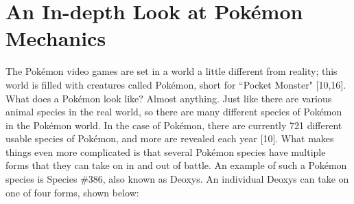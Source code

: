 \documentclass{article}
\begin{document}
\section{An In-depth Look at Pok\'emon Mechanics}
The Pok\'emon video games are set in a world a little different from reality; this world is filled with creatures called Pok\'emon, short for ``Pocket Monster" [10,16]. What does a Pok\'emon look like? Almost anything. Just like there are various animal species in the real world, so there are many different species of Pok\'emon in the Pok\'emon world. In the case of Pok\'emon, there are currently 721 different usable species of Pok\'emon, and more are revealed each year [10]. What makes things even more complicated is that several Pok\'emon species have multiple forms that they can take on in and out of battle. An example of such a Pok\'emon species is Species \#386, also known as Deoxys. An individual Deoxys can take on one of four forms, shown below:
\end{document}
